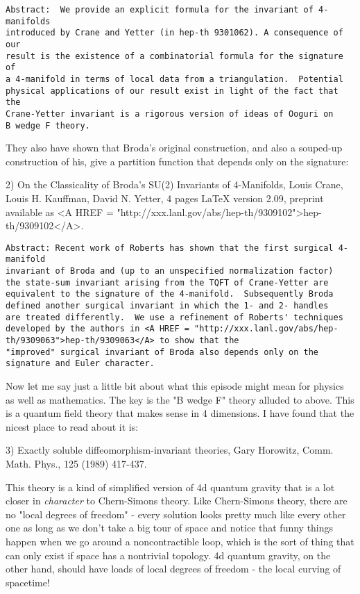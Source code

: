 \begin{verbatim}
Abstract:  We provide an explicit formula for the invariant of 4-manifolds
introduced by Crane and Yetter (in hep-th 9301062). A consequence of our
result is the existence of a combinatorial formula for the signature of
a 4-manifold in terms of local data from a triangulation.  Potential
physical applications of our result exist in light of the fact that the
Crane-Yetter invariant is a rigorous version of ideas of Ooguri on
B wedge F theory.
\end{verbatim}
    

They also have shown that Broda's original construction, and also a
souped-up construction of his, give a partition function that depends
only on the signature:

2)  On the Classicality of Broda's SU(2) Invariants of 4-Manifolds,
Louis Crane, Louis H. Kauffman, David N. Yetter, 4 pages LaTeX version
2.09, preprint available as <A HREF = "http://xxx.lanl.gov/abs/hep-th/9309102">hep-th/9309102</A>.

\begin{verbatim}
Abstract: Recent work of Roberts has shown that the first surgical 4-manifold
invariant of Broda and (up to an unspecified normalization factor)
the state-sum invariant arising from the TQFT of Crane-Yetter are
equivalent to the signature of the 4-manifold.  Subsequently Broda
defined another surgical invariant in which the 1- and 2- handles
are treated differently.  We use a refinement of Roberts' techniques
developed by the authors in <A HREF = "http://xxx.lanl.gov/abs/hep-th/9309063">hep-th/9309063</A> to show that the
"improved" surgical invariant of Broda also depends only on the
signature and Euler character.
\end{verbatim}
    

Now let me say just a little bit about what this episode might mean for
physics as well as mathematics.  The key is the "B wedge F" theory
alluded to above.   This is a quantum field theory that makes sense in 4
dimensions.  I have found that the nicest place to read about it is:

3)  Exactly soluble diffeomorphism-invariant theories, Gary Horowitz,
Comm. Math. Phys., 125 (1989) 417-437.

This theory is a kind of simplified version of 4d quantum gravity that
is a lot closer in \emph{character} to Chern-Simons theory.  Like
Chern-Simons theory, there are no "local degrees of freedom" - every
solution looks pretty much like every other one as long as we don't take
a big tour of space and notice that funny things happen when we go
around a noncontractible loop, which is the sort of thing that can only
exist if space has a nontrivial topology.  4d quantum gravity, on the
other hand, should have loads of local degrees of freedom - the local
curving of spacetime!  


